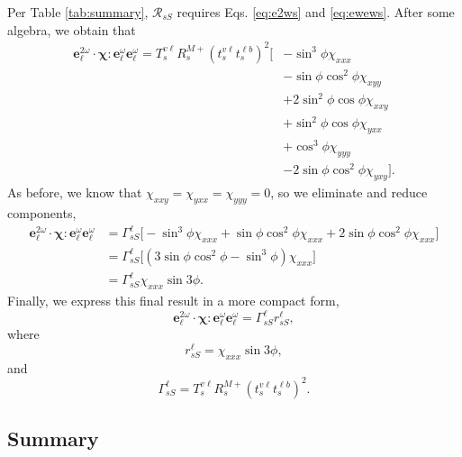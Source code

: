 \documentclass{article}
\begin{document}
Per Table \ref{tab:summary}, $\mathcal{R}_{sS}$ requires Eqs. \eqref{eq:e2ws}
and \eqref{eq:ewews}. After some algebra, we obtain that
\begin{equation*}
\begin{split}
\mathbf{e}^{2\omega}_{\ell}\cdot\boldsymbol{\chi}:
\mathbf{e}^{\omega}_{\ell}\mathbf{e}^{\omega}_{\ell} = 
T_{s}^{v\ell}R^{M+}_{s}
\left(t^{v\ell}_{s}t^{\ell b}_{s}\right)^{2}
\big[
&- \sin^{3}\phi\chi_{xxx}\\
&- \sin\phi\cos^{2}\phi\chi_{xyy}\\
&+ 2\sin^{2}\phi\cos\phi\chi_{xxy}\\
&+ \sin^{2}\phi\cos\phi\chi_{yxx}\\
&+ \cos^{3}\phi\chi_{yyy}\\
&- 2\sin\phi\cos^{2}\phi\chi_{yxy}
\big].
\end{split}
\end{equation*}
As before, we know that $\chi_{xxy}=\chi_{yxx}=\chi_{yyy}=0$, so we eliminate
and reduce components,
\begin{equation*}
\begin{split}
\mathbf{e}^{2\omega}_{\ell}\cdot\boldsymbol{\chi}:
\mathbf{e}^{\omega}_{\ell}\mathbf{e}^{\omega}_{\ell} &= 
\Gamma^{\ell}_{sS}
\big[
- \sin^{3}\phi\chi_{xxx}
+ \sin\phi\cos^{2}\phi\chi_{xxx}
+ 2\sin\phi\cos^{2}\phi\chi_{xxx}
\big]\\
&= 
\Gamma^{\ell}_{sS}
\big[
(3\sin\phi\cos^{2}\phi- \sin^{3}\phi)\chi_{xxx}
\big]\\
&= \Gamma^{\ell}_{sS}\chi_{xxx}\sin3\phi.
\end{split}
\end{equation*}
Finally, we express this final result in a more compact form,
\begin{equation}
\mathbf{e}^{2\omega}_{\ell}\cdot\boldsymbol{\chi}:
\mathbf{e}^{\omega}_{\ell}\mathbf{e}^{\omega}_{\ell} = 
\Gamma^{\ell}_{sS}r^{\ell}_{sS},
\end{equation}
where
\begin{equation}
r^{\ell}_{sS} = \chi_{xxx}\sin3\phi,
\end{equation}
and
\begin{equation}
\Gamma^{\ell}_{sS} = 
T_{s}^{v\ell}R^{M+}_{s}\left(t^{v\ell}_{s}t^{\ell b}_{s}\right)^{2}.
\end{equation}


\subsection{Summary}
\end{document}
